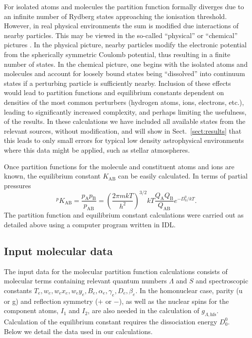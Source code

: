 \documentclass[traditabstract]{aa} %
\begin{document}
For isolated atoms and molecules the partition function formally diverges due to an infinite number of Rydberg states approaching the ionisation threshold.  However, in real physical environments the sum is modified due interactions of nearby particles.  This may be viewed in the so-called ``physical'' or ``chemical'' pictures \citep[e.g.][]{Dappen1987,rogers_opal_1996}.  In the physical picture, nearby particles modify the electronic potential from the spherically symmetric Coulomb potential, thus resulting in a finite number of states.   In the chemical picture, one begins with the isolated atoms and molecules and account for loosely bound states being ``dissolved'' into continuum states if a perturbing particle is sufficiently nearby.   Inclusion of these effects would lead to partition functions and equilibrium constants dependent on densities of the most common perturbers (hydrogen atoms, ions, electrons, etc.), leading to significantly increased complexity, and perhaps limiting the usefulness, of the results.   In these calculations we have included all available states from the relevant sources, without modification, and will show in Sect.~\ref{sect:results} that this leads to only small errors for typical low density astrophysical environments where this data might be applied, such as stellar atmospheres.

Once partition functions for the molecule and constituent atoms and ions are known, the equilibrium constant $K_\mathrm{AB}$ can be easily calculated. In terms of partial pressures \citep[e.g.][]{1966PDAO...13....1T}  
\begin{equation}
^p K_\mathrm{AB} = \frac{p_\mathrm{A} p_\mathrm{B}}{p_\mathrm{AB}} = \left( \frac{2\pi mkT}{h^2} \right)^{3/2} kT \frac{Q_\mathrm{A} Q_\mathrm{B}}{Q_\mathrm{AB}} e^{-D_0^0/kT} .
\label{eqn:equil}
\end{equation}
The partition function and equilibrium constant calculations were carried out as detailed above using a computer program written in IDL.


\subsection{Input molecular data}

The input data for the molecular partition function calculations consists of molecular terms containing relevant quantum numbers $\Lambda$ and $S$ and spectroscopic constants $T_e, w_e, w_e x_e, w_e y_e, B_e, \alpha_e, \gamma_e, D_e, \beta_e$.  In the homonuclear case, parity (u or g) and reflection symmetry ($+$ or $-$), as well as the nuclear spins for the component atoms, $I_1$ and $I_2$, are also needed in the calculation of $g_{\Lambda, \mathrm{hfs}}$.  Calculation of the equilibrium constant requires the dissociation energy $D_0^0$.  Below we detail the data used in our calculations.
\end{document}
